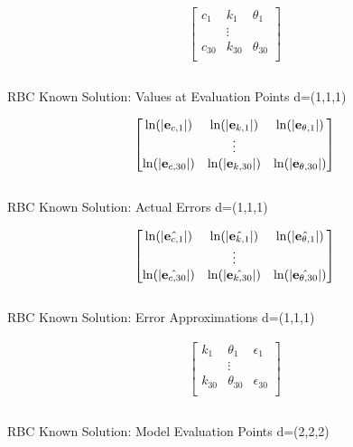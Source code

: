 \documentclass[12pt]{article}
\begin{document}
\begin{table}
  \centering
  
\begin{gather*}
  \begin{bmatrix}
    c_1&k_1&\theta_1\\
&\vdots\\
    c_{30}&k_{30}&\theta_{30}\\
  \end{bmatrix}\\
%  
\end{gather*}\\
  \caption{RBC Known Solution: Values at Evaluation Points \label{valatA} d=(1,1,1)}
\end{table}

 \begin{table}
    \centering
   \begin{gather*}
\forActErr\\
%  
   \end{gather*}\\
   \caption{RBC Known Solution: Actual Errors\label{acterrA} d=(1,1,1)}
 \end{table}

 \begin{table}
   \centering
  
   \begin{gather*}
\forEstErr\\
%   
   \end{gather*}\\
   \caption{RBC Known Solution: Error Approximations\label{esterrA} d=(1,1,1)}
 \end{table}


\begin{table}
  \centering
  
\begin{gather*}
  \begin{bmatrix}
    k_1&\theta_1&\epsilon_1\\
&\vdots\\
    k_{30}&\theta_{30}&\epsilon_{30}\\
  \end{bmatrix}\\
%  
\end{gather*}\\
  \caption{RBC Known Solution: Model Evaluation Points \label{evalpB} d=(2,2,2)}
\end{table}
\end{document}
